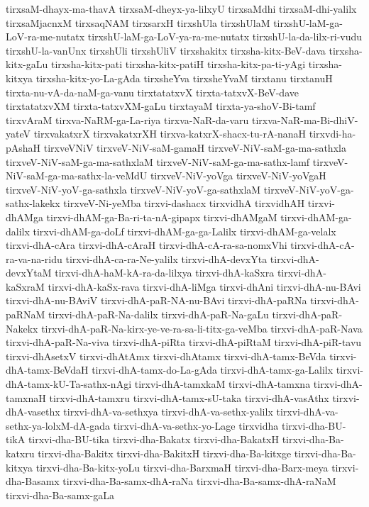 {tirxsaM-dhayx-ma-thavA
tirxsaM-dheyx-ya-lilxyU
tirxsaMdhi
tirxsaM-dhi-yalilx
tirxsaMjacnxM
tirxsaqNAM
tirxsarxH
tirxshUla
tirxshUlaM
tirxshU-laM-ga-LoV-ra-me-nutatx
tirxshU-laM-ga-LoV-ya-ra-me-nutatx
tirxshU-la-da-lilx-ri-vudu
tirxshU-la-vanUnx
tirxshUli
tirxshUliV
tirxshakitx
tirxsha-kitx-BeV-dava
tirxsha-kitx-gaLu
tirxsha-kitx-pati
tirxsha-kitx-patiH
tirxsha-kitx-pa-ti-yAgi
tirxsha-kitxya
tirxsha-kitx-yo-La-gAda
tirxsheYva
tirxsheYvaM
tirxtanu
tirxtanuH
tirxta-nu-vA-da-naM-ga-vanu
tirxtatatxvX
tirxta-tatxvX-BeV-dave
tirxtatatxvXM
tirxta-tatxvXM-gaLu
tirxtayaM
tirxta-ya-shoV-Bi-tamf
tirxvAraM
tirxva-NaRM-ga-La-riya
tirxva-NaR-da-varu
tirxva-NaR-ma-Bi-dhiV-yateV
tirxvakatxrX
tirxvakatxrXH
tirxva-katxrX-shacx-tu-rA-nanaH
tirxvdi-ha-pAshaH
tirxveVNiV
tirxveV-NiV-saM-gamaH
tirxveV-NiV-saM-ga-ma-sathxla
tirxveV-NiV-saM-ga-ma-sathxlaM
tirxveV-NiV-saM-ga-ma-sathx-lamf
tirxveV-NiV-saM-ga-ma-sathx-la-veMdU
tirxveV-NiV-yoVga
tirxveV-NiV-yoVgaH
tirxveV-NiV-yoV-ga-sathxla
tirxveV-NiV-yoV-ga-sathxlaM
tirxveV-NiV-yoV-ga-sathx-lakekx
tirxveV-Ni-yeMba
tirxvi-dashacx
tirxvidhA
tirxvidhAH
tirxvi-dhAMga
tirxvi-dhAM-ga-Ba-ri-ta-nA-gipapx
tirxvi-dhAMgaM
tirxvi-dhAM-ga-dalilx
tirxvi-dhAM-ga-doLf
tirxvi-dhAM-ga-ga-Lalilx
tirxvi-dhAM-ga-velalx
tirxvi-dhA-cAra
tirxvi-dhA-cAraH
tirxvi-dhA-cA-ra-sa-nomxVhi
tirxvi-dhA-cA-ra-va-na-ridu
tirxvi-dhA-ca-ra-Ne-yalilx
tirxvi-dhA-devxYta
tirxvi-dhA-devxYtaM
tirxvi-dhA-haM-kA-ra-da-lilxya
tirxvi-dhA-kaSxra
tirxvi-dhA-kaSxraM
tirxvi-dhA-kaSx-rava
tirxvi-dhA-liMga
tirxvi-dhAni
tirxvi-dhA-nu-BAvi
tirxvi-dhA-nu-BAviV
tirxvi-dhA-paR-NA-nu-BAvi
tirxvi-dhA-paRNa
tirxvi-dhA-paRNaM
tirxvi-dhA-paR-Na-dalilx
tirxvi-dhA-paR-Na-gaLu
tirxvi-dhA-paR-Nakekx
tirxvi-dhA-paR-Na-kirx-ye-ve-ra-sa-li-titx-ga-veMba
tirxvi-dhA-paR-Nava
tirxvi-dhA-paR-Na-viva
tirxvi-dhA-piRta
tirxvi-dhA-piRtaM
tirxvi-dhA-piR-tavu
tirxvi-dhAsetxV
tirxvi-dhAtAmx
tirxvi-dhAtamx
tirxvi-dhA-tamx-BeVda
tirxvi-dhA-tamx-BeVdaH
tirxvi-dhA-tamx-do-La-gAda
tirxvi-dhA-tamx-ga-Lalilx
tirxvi-dhA-tamx-kU-Ta-sathx-nAgi
tirxvi-dhA-tamxkaM
tirxvi-dhA-tamxna
tirxvi-dhA-tamxnaH
tirxvi-dhA-tamxru
tirxvi-dhA-tamx-sU-taka
tirxvi-dhA-vasAthx
tirxvi-dhA-vasethx
tirxvi-dhA-va-sethxya
tirxvi-dhA-va-sethx-yalilx
tirxvi-dhA-va-sethx-ya-lolxM-dA-gada
tirxvi-dhA-va-sethx-yo-Lage
tirxvidha
tirxvi-dha-BU-tikA
tirxvi-dha-BU-tika
tirxvi-dha-Bakatx
tirxvi-dha-BakatxH
tirxvi-dha-Ba-katxru
tirxvi-dha-Bakitx
tirxvi-dha-BakitxH
tirxvi-dha-Ba-kitxge
tirxvi-dha-Ba-kitxya
tirxvi-dha-Ba-kitx-yoLu
tirxvi-dha-BarxmaH
tirxvi-dha-Barx-meya
tirxvi-dha-Basamx
tirxvi-dha-Ba-samx-dhA-raNa
tirxvi-dha-Ba-samx-dhA-raNaM
tirxvi-dha-Ba-samx-gaLa
}

